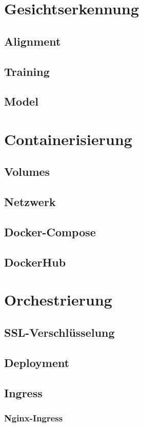 \section{Gesichtserkennung}
\subsection{Alignment}
\subsection{Training}
\subsection{Model}

\section{Containerisierung}
\subsection{Volumes}
\subsection{Netzwerk}
\subsection{Docker-Compose}
\subsection{DockerHub}

\section{Orchestrierung}
\subsection{SSL-Verschlüsselung}
\subsection{Deployment}
\subsection{Ingress}
\subsubsection{Nginx-Ingress}
